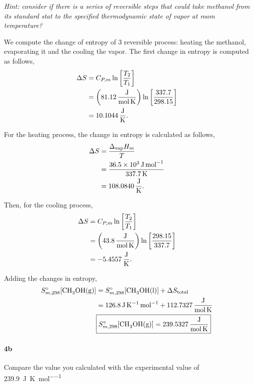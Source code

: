 \documentclass[main.tex]{subfiles}
\begin{document}
\textit{Hint: consider if there is a series of reversible steps that could take methanol from its standard stat to the specified thermodynamic state of vapor at room temperature?}


We compute the change of entropy of 3 reversible process: heating the methanol, evaporating it and the cooling the vapor.
The first change in entropy is computed as follows,
\begin{align*}
    \Delta S &= C_{P,m}\ln\qty[\frac{T_2}{T_1}]  \\
    &= \qty(\SI[per-mode=fraction]{81.12}{\joule\per\mole\per\kelvin})\ln\qty[\frac{337.7}{298.15}] \\
    &=\SI[per-mode=fraction]{10.1044}{\joule\per\kelvin}.
\end{align*}

For the heating process, the change in entropy is calculated as follows,
\begin{align*}
    \Delta S &= \frac{\Delta_{\mathrm{vap}} H_m}{T} \\
    &= \frac{\SI{36.5d3}{\joule\per\mole}}{\SI{337.7}{\kelvin}} \\
    &=\SI[per-mode=fraction]{108.0840}{\joule\per\kelvin}.
\end{align*}

Then, for the cooling process,
\begin{align*}
    \Delta S &= C_{P,m}\ln\qty[\frac{T_2}{T_1}]  \\
    &= \qty(\SI[per-mode=fraction]{43.8}{\joule\per\mole\per\kelvin})\ln\qty[\frac{298.15}{337.7}] \\
    &=-\SI[per-mode=fraction]{5.4557}{\joule\per\kelvin}.
\end{align*}

Adding the changes in entropy,
\begin{align*}
    S_{m,298}^{\circ}[\mathrm{\ce{CH3OH(g)}}]&=S_{m,298}^{\circ}[\mathrm{\ce{CH3OH(l)}}] + \Delta S_{\mathrm{total}} \\
    &= \SI{126.8}{\joule\per\kelvin\per\mole} + \SI[per-mode=fraction]{112.7327}{\joule\per\mole\per\kelvin}\\
    &\boxed{S_{m,298}^{\circ}[\mathrm{\ce{CH3OH(g)}}]=\SI[per-mode=fraction]{239.5327}{\joule\per\mole\per\kelvin}} 
\end{align*}


\paragraph{4b} Compare the value you calculated with the experimental value of \SI{239.9}{\joule\per\kelvin\per\mole}
\end{document}
